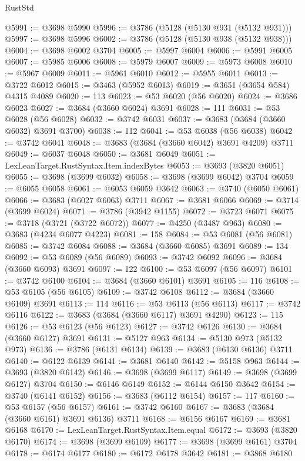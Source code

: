 \begin{lexlean}{RustStd}
\begin{coremodule}
@5991 := @3698 @5990
@5996 := @3786 (@5128 (@5130 @931 (@5132 @931)))
@5997 := @3698 @5996
@6002 := @3786 (@5128 (@5130 @938 (@5132 @938)))
@6004 := @3698 @6002 @3704
@6005 := @5997 @6004
@6006 := @5991 @6005
@6007 := @5985 @6006
@6008 := @5979 @6007
@6009 := @5973 @6008
@6010 := @5967 @6009
@6011 := @5961 @6010
@6012 := @5955 @6011
@6013 := @3722 @6012
@6015 := @3463 (@5952 @6013)
@6019 := @3651 (@3654 @584) @4315 @4089
@6020 := 113
@6023 := @53 @6020 (@56 @6020)
@6024 := @3686 @6023
@6027 := @3684 (@3660 @6024) @3691
@6028 := 111
@6031 := @53 @6028 (@56 @6028)
@6032 := @3742 @6031
@6037 := @3683 (@3684 (@3660 @6032) @3691 @3700)
@6038 := 112
@6041 := @53 @6038 (@56 @6038)
@6042 := @3742 @6041
@6048 := @3683 (@3684 (@3660 @6042) @3691 @4209) @3711
@6049 := @6037 @6048
@6050 := @3681 @6049
@6051 := LexLeanTarget.RustSyntax.Item.indexBytes
@6053 := @3693 (@3820 @6051)
@6055 := @3698 (@3699 @6032)
@6058 := @3698 (@3699 @6042) @3704
@6059 := @6055 @6058
@6061 := @6053 @6059 @3642
@6063 := @3740 (@6050 @6061)
@6066 := @3683 (@6027 @6063) @3711
@6067 := @3681 @6066
@6069 := @3714 (@3699 @6024)
@6071 := @3786 (@3942 @1155)
@6072 := @3723 @6071
@6075 := @3718 (@3721 (@3722 @6072))
@6077 := @4250 (@3487 @963)
@6080 := @3683 (@4234 @6077 @4223)
@6081 := 158
@6084 := @53 @6081 (@56 @6081)
@6085 := @3742 @6084
@6088 := @3684 (@3660 @6085) @3691
@6089 := 134
@6092 := @53 @6089 (@56 @6089)
@6093 := @3742 @6092
@6096 := @3684 (@3660 @6093) @3691
@6097 := 122
@6100 := @53 @6097 (@56 @6097)
@6101 := @3742 @6100
@6104 := @3684 (@3660 @6101) @3691
@6105 := 116
@6108 := @53 @6105 (@56 @6105)
@6109 := @3742 @6108
@6112 := @3684 (@3660 @6109) @3691
@6113 := 114
@6116 := @53 @6113 (@56 @6113)
@6117 := @3742 @6116
@6122 := @3683 (@3684 (@3660 @6117) @3691 @4290)
@6123 := 115
@6126 := @53 @6123 (@56 @6123)
@6127 := @3742 @6126
@6130 := @3684 (@3660 @6127) @3691
@6131 := @5127 @963
@6134 := @5130 @973 (@5132 @973)
@6136 := @3786 (@6131 @6134)
@6139 := @3683 (@6130 @6136) @3711
@6140 := @6122 @6139
@6141 := @3681 @6140
@6142 := @5158 @963
@6144 := @3693 (@3820 @6142)
@6146 := @3698 (@3699 @6117)
@6149 := @3698 (@3699 @6127) @3704
@6150 := @6146 @6149
@6152 := @6144 @6150 @3642
@6154 := @3740 (@6141 @6152)
@6156 := @3683 (@6112 @6154)
@6157 := 117
@6160 := @53 @6157 (@56 @6157)
@6161 := @3742 @6160
@6167 := @3683 (@3684 (@3660 @6161) @3691 @6136) @3711
@6168 := @6156 @6167
@6169 := @3681 @6168
@6170 := LexLeanTarget.RustSyntax.Item.equal
@6172 := @3693 (@3820 @6170)
@6174 := @3698 (@3699 @6109)
@6177 := @3698 (@3699 @6161) @3704
@6178 := @6174 @6177
@6180 := @6172 @6178 @3642
@6181 := @3868 @6180

\end{coremodule}
\end{lexlean}
